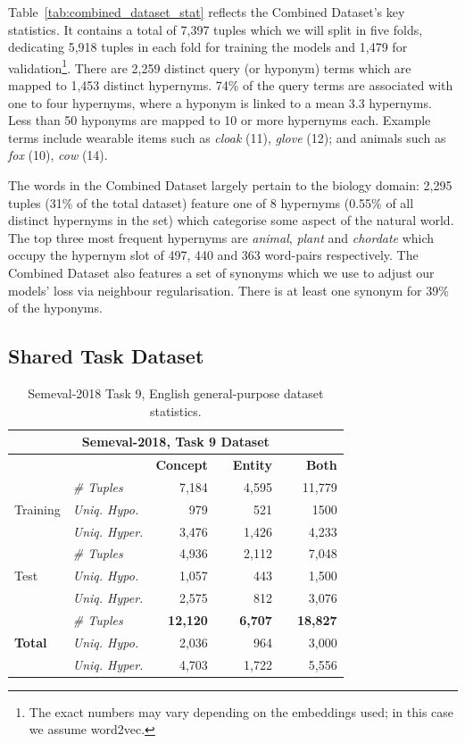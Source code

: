 Table~\ref{tab:combined_dataset_stat} reflects the Combined Dataset's key statistics.  It contains a total of 7,397 tuples which we will split in five folds, dedicating 5,918 tuples in each fold for training the models and 1,479 for validation\footnote{The exact numbers may vary depending on the embeddings used; in this case we assume word2vec.}.  There are 2,259 distinct query (or hyponym) terms which are mapped to 1,453 distinct hypernyms.  74\% of the query terms are associated with one to four hypernyms, where a hyponym is linked to a mean 3.3 hypernyms.  Less than 50 hyponyms are mapped to 10 or more hypernyms each.  Example terms include wearable items such as \textit{cloak} (11), \textit{glove} (12); and animals such as \textit{fox} (10), \textit{cow} (14).  

The words in the Combined Dataset largely pertain to the biology domain: 2,295 tuples (31\% of the total dataset) feature one of 8 hypernyms (0.55\% of all distinct hypernyms in the set) which categorise some aspect of the natural world.  The top three most frequent hypernyms are \textit{animal}, \textit{plant} and \textit{chordate} which occupy the hypernym slot of 497, 440 and 363 word-pairs respectively.  The Combined Dataset also features a set of synonyms which we use to adjust our models' loss via neighbour regularisation.  There is at least one synonym for 39\% of the hyponyms.

\subsection{Shared Task Dataset}
\begin{table}\centering
\begin{tabular}{@{}llrcrcr@{}}\toprule
\multicolumn{7}{c}{\textbf{Semeval-2018, Task 9 Dataset}} \\ \midrule
& & \textbf{Concept} & \phantom{a} & \textbf{Entity} & \phantom{a} & \textbf{Both} \\
\cmidrule{3-3} \cmidrule{5-5} \cmidrule{7-7}
\multirow{3}{*}{Training} & \textit{\# Tuples} & 7,184 && 4,595 && 11,779 \\
& \textit{Uniq. Hypo.} & 979 && 521 && 1500\\
& \textit{Uniq. Hyper.} & 3,476 && 1,426 && 4,233\\ 
\cmidrule{2-7}
\multirow{3}{*}{Test} & \textit{\# Tuples} & 4,936 && 2,112 && 7,048 \\
& \textit{Uniq. Hypo.} & 1,057 && 443 && 1,500\\
& \textit{Uniq. Hyper.} & 2,575 && 812 && 3,076\\
\cmidrule{2-7}
\multirow{3}{*}{\textbf{Total}} & \textit{\# Tuples} & \textbf{12,120} && \textbf{6,707} && \textbf{18,827} \\
& \textit{Uniq. Hypo.} & 2,036 && 964 && 3,000\\
& \textit{Uniq. Hyper.} & 4,703 && 1,722 && 5,556\\
\bottomrule
\end{tabular}
\caption{Semeval-2018 Task 9, English general-purpose dataset statistics.}\label{tab:semeval_dataset_stat}
\end{table}

